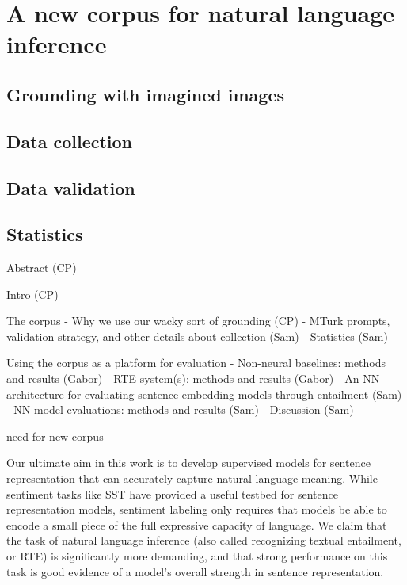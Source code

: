 \section{A new corpus for natural language inference}\label{sec:discussion}

\subsection{Grounding with imagined images}

\subsection{Data collection}

\subsection{Data validation}

\subsection{Statistics}

Abstract (CP)

Intro (CP)

The corpus
- Why we use our wacky sort of grounding (CP)
- MTurk prompts, validation strategy, and other details about collection (Sam)
- Statistics (Sam)

Using the corpus as a platform for evaluation
- Non-neural baselines: methods and results (Gabor)
- RTE system(s): methods and results (Gabor)
- An NN architecture for evaluating sentence embedding models through entailment (Sam)
- NN model evaluations: methods and results (Sam)
- Discussion (Sam)


need for new corpus

Our ultimate aim in this work is to develop supervised models for sentence representation that can accurately capture natural language meaning. While sentiment tasks like SST have provided a useful testbed for sentence representation models, sentiment labeling only requires that models be able to encode a small piece of the full expressive capacity of language. We claim that the task of natural language inference (also called recognizing textual entailment, or RTE) is significantly more demanding, and that strong performance on this task is good evidence of a model's overall strength in sentence representation.



